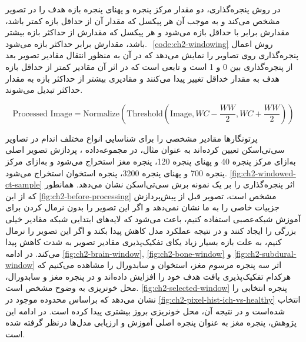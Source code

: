 در روش پنجره‌گذاری، دو مقدار مرکز پنجره
و پهنای پنجره
بازه هدف را در تصویر مشخص می‌کند و به موجب آن هر پیکسل که مقدار آن از حداقل بازه کمتر باشد، مقدارش برابر با حداقل بازه می‌شود و هر پیکسل که مقدارش از حداکثر بازه بیشتر باشد، مقدارش برابر حداکثر بازه می‌شود. ‎
\autoref{code:ch2-windowing}
روش اعمال پنجره‌گذاری روی تصاویر را نمایش می‌دهد که در آن 
به منظور انتقال مقادیر تصویر بعد از پنجره‌گذاری بین 0 و 1 است و 
تابعی است که در اثر آن مقادیر کمتر از حداقل بازه هدف به مقدار خداقل تغییر پیدا می‌کنند و مقادیری بیشتر از حداکثر بازه به مقدار حداکثر تبدیل می‌شوند.   
\begin{latin}
\begin{equation}
\text{Processed Image} = \text{Normalize}(\text{Threshold}(\text{Image}, WC-\frac{WW}{2},WC+\frac{WW}{2})) 
\end{equation}
\label{code:ch2-windowing}
\end{latin}

پرتونگار‌ها مقادیر مشخصی را برای شناسایی انواع مختلف اندام در تصاویر سی‌تی‌اسکن تعیین کرده‌اند به عنوان مثال، در مجموعه‌داده
،
پردازش تصویر اصلی به‌ازای مرکز پنجره 40 و پهنای پنجره 120، پنجره مغز استخراج می‌شود و به‌ازای مرکز پنجره 700 و پهنای پنجره 3200،‌ پنجره استخوان استخراج می‌شود.
\autoref{fig:ch2-windowed-ct-sample}
اثر پنجره‌گذاری را بر یک نمونه برش سی‌تی‌اسکن نشان می‌دهد. همانطور که از این
\autoref{fig:ch2-before-processing}
 مشخص است، تصویر قبل از پیش‌پردازش جزییات خاصی را به ما نشان نمی‌دهد و اگر این تصویر را بدون نرمال کردن برای آموزش شبکه‌عصبی استفاده کنیم، باعث می‌شود که لایه‌های ابتدایی شبکه مقادیر خیلی بزرگی را ایجاد کنند و در نتیجه عملکرد مدل کاهش پیدا بکند و اگر این تصویر را نرمال کنیم، به علت بازه بسیار زیاد یکای 
تفکیک‌پذیری مقادیر تصویر به شدت کاهش پیدا می‌کند. در ادامه
\autoref{fig:ch2-brain-window}, \autoref{fig:ch2-bone-window} و \autoref{fig:ch2-subdural-window}
اثر سه پنجره مرسوم مغز، استخوان و سابدورال را مشاهده می‌کنیم که هرکدام تفکیک‌پذیری بافت هدف خود را افزایش داده‌اند و در پنجره مغز و سابدورال، محل خونریزی به وضوح مشخص است.
\autoref{fig:ch2-selected-window}
 پنجره انتخابی را نشان می‌دهد که براساس محدوده موجود در  
\autoref{fig:ch2-pixel-hist-ich-vs-healthy}
انتخاب شده‌است و در نتیجه آن، محل خونریزی بروز بیشتری پیدا کرده است. در ادامه این پژوهش،‌ پنجره مغز به عنوان پنجره اصلی آموزش و ارزیابی مدل‌ها درنظر گرفته شده است.




